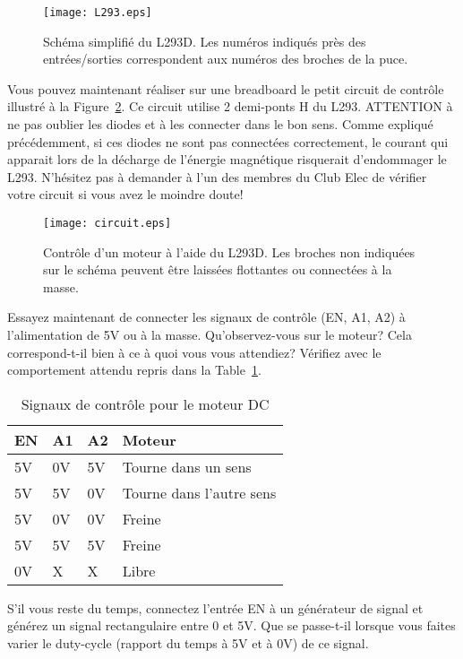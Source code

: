 \begin{figure}[!t]
\centering
\texttt{[image: L293.eps]}
\caption{Schéma simplifié du L293D. Les numéros indiqués près des entrées/sorties correspondent aux numéros des broches de la puce.}
\label{L293}
\end{figure}


Vous pouvez maintenant réaliser sur une breadboard le petit circuit de contrôle illustré à la Figure~\ref{circuit}. Ce circuit utilise 2 demi-ponts H du L293. ATTENTION à ne pas oublier les diodes et à les connecter dans le bon sens. Comme expliqué précédemment, si ces diodes ne sont pas connectées correctement, le courant qui apparait lors de la décharge de l'énergie magnétique risquerait d'endommager le L293. N'hésitez pas à demander à l'un des membres du Club Elec de vérifier votre circuit si vous avez le moindre doute!\\

\begin{figure}[!t]
\centering
\texttt{[image: circuit.eps]}
\caption{Contrôle d'un moteur à l'aide du L293D. Les broches non indiquées sur le schéma peuvent être laissées flottantes ou connectées à la masse.}
\label{circuit}
\end{figure}

Essayez maintenant de connecter les signaux de contrôle (EN, A1, A2) à l'alimentation de 5V ou à la masse. Qu'observez-vous sur le moteur? Cela correspond-t-il bien à ce à quoi vous vous attendiez? Vérifiez avec le comportement attendu repris dans la Table~\ref{signal}.\\

\begin{table}[!t]
\caption{Signaux de contrôle pour le moteur DC}
\begin{center}
\begin{tabular}{|l|l|l|l|}
\hline
\textbf{EN}& \textbf{A1} & \textbf{A2} &\textbf{Moteur}\\
\hline
5V & 0V & 5V & Tourne dans un sens\\
5V & 5V & 0V & Tourne dans l'autre sens\\
5V & 0V & 0V & Freine\\
5V & 5V & 5V & Freine\\
0V & X & X & Libre\\
\hline
\end{tabular}
\label{signal}
\end{center}
\end{table}

S'il vous reste du temps, connectez l'entrée EN à un générateur de signal et générez un signal rectangulaire entre 0 et 5V. Que se passe-t-il lorsque vous faites varier le duty-cycle (rapport du temps à 5V et à 0V) de ce signal.
